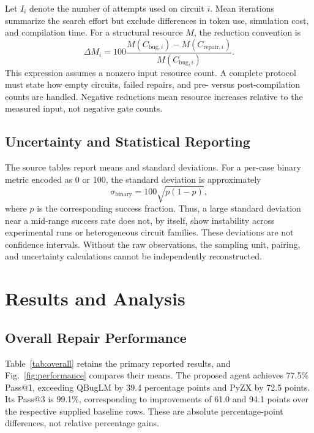 \documentclass[conference]{IEEEtran}
\begin{document}
Let $I_i$ denote the number of attempts used on circuit $i$. Mean iterations summarize the search effort but exclude differences in token use, simulation cost, and compilation time. For a structural resource $M$, the reduction convention is
\begin{equation}
 \Delta M_i=100\frac{M(C_{\mathrm{bug},i})-M(C_{\mathrm{repair},i})}
 {M(C_{\mathrm{bug},i})}.
\end{equation}
This expression assumes a nonzero input resource count. A complete protocol must state how empty circuits, failed repairs, and pre- versus post-compilation counts are handled. Negative reductions mean resource increases relative to the measured input, not negative gate counts.

\subsection{Uncertainty and Statistical Reporting}
The source tables report means and standard deviations. For a per-case binary metric encoded as 0 or 100, the standard deviation is approximately
\begin{equation}
 \sigma_{\mathrm{binary}}=100\sqrt{p(1-p)},
\end{equation}
where $p$ is the corresponding success fraction. Thus, a large standard deviation near a mid-range success rate does not, by itself, show instability across experimental runs or heterogeneous circuit families. These deviations are not confidence intervals. Without the raw observations, the sampling unit, pairing, and uncertainty calculations cannot be independently reconstructed.

\section{Results and Analysis}
\subsection{Overall Repair Performance}
Table~\ref{tab:overall} retains the primary reported results, and Fig.~\ref{fig:performance} compares their means. The proposed agent achieves 77.5\% Pass@1, exceeding QBugLM by 39.4 percentage points and PyZX by 72.5 points. Its Pass@3 is 99.1\%, corresponding to improvements of 61.0 and 94.1 points over the respective supplied baseline rows. These are absolute percentage-point differences, not relative percentage gains.
\end{document}

